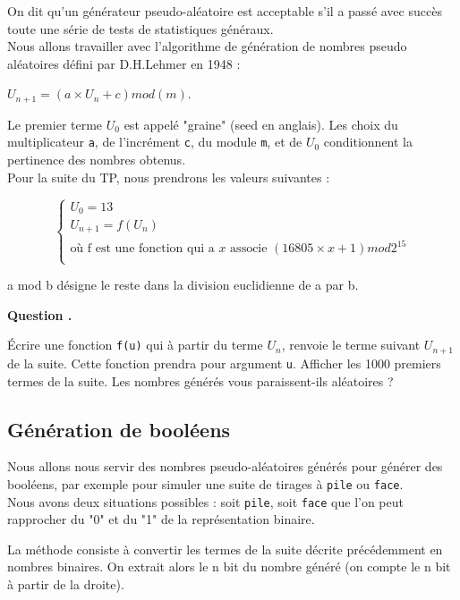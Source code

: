 \documentclass[t,11pt]{article}
\newcounter{cexo}
\newenvironment{qexo}{
\refstepcounter{cexo}
\vspace{3 pt}
\noindent
\begin{minipage}[t]{0.15\textwidth}
\textbf{\noindent Question \arabic{cexo}. }
\end{minipage}\noindent
\begin{minipage}[t]{0.85\textwidth}}{\vspace{3 pt}
\end{minipage}}%
\begin{document}
On dit qu'un générateur pseudo-aléatoire est acceptable s'il a passé avec succès toute une série de tests de statistiques généraux.\\

Nous allons travailler avec l'algorithme de génération de nombres pseudo aléatoires défini par D.H.Lehmer en 1948 : 
\begin{center}
$U_{n+1}=(a \times U_n+c)mod(m)$.
\end{center}
Le premier terme $U_0$ est appelé "graine" (seed en anglais). Les choix du multiplicateur \texttt{a}, de l'incrément \texttt{c}, du module \texttt{m}, et de $U_0$ conditionnent la pertinence des nombres obtenus.\\

Pour la suite du TP, nous prendrons les valeurs suivantes :


$$\left\{ \begin{array}{l}
   U_0=13  \\
   U_{n+1}=f( U_{n})\\
\mbox{où f est une fonction qui a } x \mbox{ associe }
(16805 \times x+1)mod2^{15}  \\
\end{array} \right.$$
\begin{center}
a mod b désigne le reste dans la division euclidienne de a par b.
\end{center}



\begin{qexo}
\'Ecrire une fonction \texttt{f(u)} qui à partir du terme $U_n$, renvoie le terme suivant $U_{n+1}$ de la suite. Cette fonction prendra pour argument \texttt{u}. Afficher les 1000 premiers termes de la suite. Les nombres générés vous paraissent-ils aléatoires ?
\end{qexo}

\subsection*{Génération de booléens}
Nous allons nous servir des nombres pseudo-aléatoires générés pour générer des booléens, par exemple pour simuler une suite de tirages à \texttt{pile} ou \texttt{face}.\\
Nous avons deux situations possibles : soit \texttt{pile}, soit \texttt{face} que l'on peut rapprocher du "0" et du "1" de la représentation binaire.

La méthode consiste à convertir les termes de la suite décrite précédemment en nombres binaires. On extrait alors le n bit du nombre généré (on compte le n bit à partir de la droite).
\end{document}
